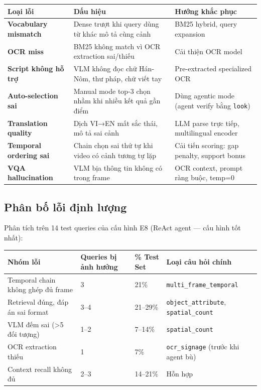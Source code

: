 \documentclass[12pt,a4paper,onecolumn]{article}
\begin{document}
\noindent
\begin{tabularx}{\textwidth}{l Y Y}
\toprule
Loại lỗi & Dấu hiệu & Hướng khắc phục \\
\midrule
\textbf{Vocabulary mismatch} & Dense trượt khi query dùng từ khác mô tả cùng cảnh & BM25 hybrid, query expansion \\
\textbf{OCR miss} & BM25 không match vì OCR extraction sai/thiếu & Cải thiện OCR model \\
\textbf{Script không hỗ trợ} & VLM không đọc chữ Hán-Nôm, thư pháp, chữ viết tay & Pre-extracted specialized OCR \\
\textbf{Auto-selection sai} & Manual mode top-3 chọn nhầm khi nhiều kết quả gần điểm & Dùng agentic mode (agent verify bằng \texttt{look}) \\
\textbf{Translation quality} & Dịch VI→EN mất sắc thái, mô tả sai cảnh & LLM parse trực tiếp, multilingual encoder \\
\textbf{Temporal ordering sai} & Chain chọn sai thứ tự khi video có cảnh tương tự lặp & Cải tiến scoring: gap penalty, support bonus \\
\textbf{VQA hallucination} & VLM bịa thông tin không có trong frame & OCR context, prompt ràng buộc, temp=0 \\
\bottomrule
\end{tabularx}


\subsection{Phân bố lỗi định lượng}

Phân tích trên 14 test queries của cấu hình E8 (ReAct agent — cấu hình tốt nhất):

\noindent
\begin{tabularx}{\textwidth}{Y l l Y}
\toprule
Nhóm lỗi & Queries bị ảnh hưởng & \% Test Set & Loại câu hỏi chính \\
\midrule
Temporal chain không ghép đủ frame & 3 & 21\% & \texttt{multi\_frame\_temporal} \\
Retrieval đúng, đáp án sai format & 3–4 & 21–29\% & \texttt{object\_attribute}, \texttt{spatial\_count} \\
VLM đếm sai (>5 đối tượng) & 1–2 & 7–14\% & \texttt{spatial\_count} \\
OCR extraction thiếu & 1 & 7\% & \texttt{ocr\_signage} (trước khi agent bù) \\
Context recall không đủ & 2–3 & 14–21\% & Hỗn hợp \\
\bottomrule
\end{tabularx}
\end{document}
